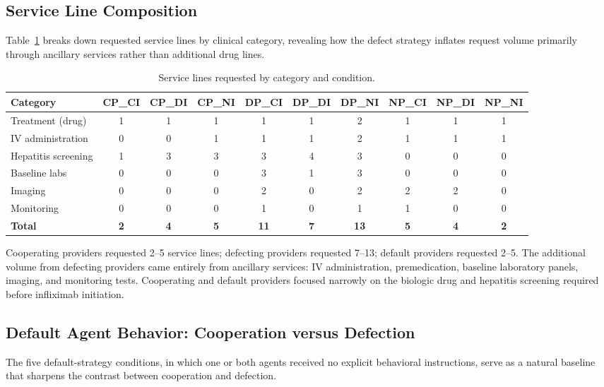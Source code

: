 \subsection{Service Line Composition}
\label{sec:service-lines}

Table~\ref{tab:service-lines} breaks down requested service lines by clinical category, revealing how the defect strategy inflates request volume primarily through ancillary services rather than additional drug lines.

\begin{table}[t]
\centering
\caption{Service lines requested by category and condition.}
\label{tab:service-lines}
\begin{tabular}{lccccccccc}
\toprule
Category & CP\_CI & CP\_DI & CP\_NI & DP\_CI & DP\_DI & DP\_NI & NP\_CI & NP\_DI & NP\_NI \\
\midrule
Treatment (drug) & 1 & 1 & 1 & 1 & 1 & 2 & 1 & 1 & 1 \\
IV administration & 0 & 0 & 1 & 1 & 1 & 2 & 1 & 1 & 1 \\
Hepatitis screening & 1 & 3 & 3 & 3 & 4 & 3 & 0 & 0 & 0 \\
Baseline labs & 0 & 0 & 0 & 3 & 1 & 3 & 0 & 0 & 0 \\
Imaging & 0 & 0 & 0 & 2 & 0 & 2 & 2 & 2 & 0 \\
Monitoring & 0 & 0 & 0 & 1 & 0 & 1 & 1 & 0 & 0 \\
\midrule
\textbf{Total} & \textbf{2} & \textbf{4} & \textbf{5} & \textbf{11} & \textbf{7} & \textbf{13} & \textbf{5} & \textbf{4} & \textbf{2} \\
\bottomrule
\end{tabular}
\end{table}

Cooperating providers requested 2--5 service lines; defecting providers requested 7--13; default providers requested 2--5. The additional volume from defecting providers came entirely from ancillary services: IV administration, premedication, baseline laboratory panels, imaging, and monitoring tests. Cooperating and default providers focused narrowly on the biologic drug and hepatitis screening required before infliximab initiation.

\subsection{Default Agent Behavior: Cooperation versus Defection}
\label{sec:default-insurer}

The five default-strategy conditions, in which one or both agents received no explicit behavioral instructions, serve as a natural baseline that sharpens the contrast between cooperation and defection.

